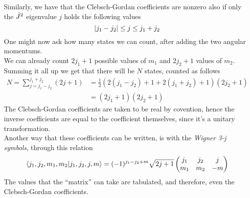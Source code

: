 \documentclass[../qm.tex]{subfiles}
\begin{document}
	Similarly, we have that the Clebsch-Gordan coefficients are nonzero also if only the $\hat{J}^2$ eigenvalue $j$ holds the following values
	\begin{equation}
		\abs{j_1-j_2}\le j\le j_1+j_2
		\label{eq:jpermittedval}
	\end{equation}
	One might now ask how many states we can count, after adding the two angular momentums.\\
	We can already count $2j_1+1$ possible values of $m_1$ and $2j_2+1$ values of $m_2$. Summing it all up we get that there will be $N$ states, counted as follows
	\begin{equation}
		\begin{aligned}
			N=\sum_{j=j_1-j_2}^{j_1+j_2}(2j+1)&=\frac{1}{2}\left( 2(j_1-j_2)+1+2(j_1+j_2)+1 \right)(2j_2+1)\\
			&=\left( 2j_1+1 \right)\left( 2j_2+1 \right)
		\end{aligned}
		\label{eq:totangmomdeg}
	\end{equation}
	The Clebsch-Gordan coefficients are taken to be real by covention, hence the inverse coefficients are equal to the coefficient themselves, since it's a unitary transformation.\\
	Another way that these coefficients can be written, is with the \textit{Wigner 3-j symbols}, through this relation
	\begin{equation}
		\bra{j_1,j_2,m_1,m_2}\ket{j_1,j_2,j,m}=(-1)^{j_1-j_2+m}\sqrt{2j+1}\begin{pmatrix}
			j_1&j_2&j\\
			m_1&m_2&-m
		\end{pmatrix}
		\label{eq:wigner3jcoeff}
	\end{equation}
	The values that the ``matrix'' can take are tabulated, and therefore, even the Clebsch-Gordan coefficients.
\end{document}
